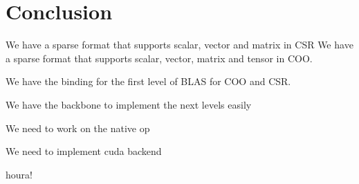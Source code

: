 \chapter{Conclusion}
 
 We have a sparse format that supports scalar, vector and matrix in CSR
 We have a sparse format that supports scalar, vector, matrix and tensor in COO. 
 
 We have the binding for the first level of BLAS for COO and CSR.
 
We have the backbone to implement the next levels easily

We need to work on the native op

We need to implement cuda backend

houra!